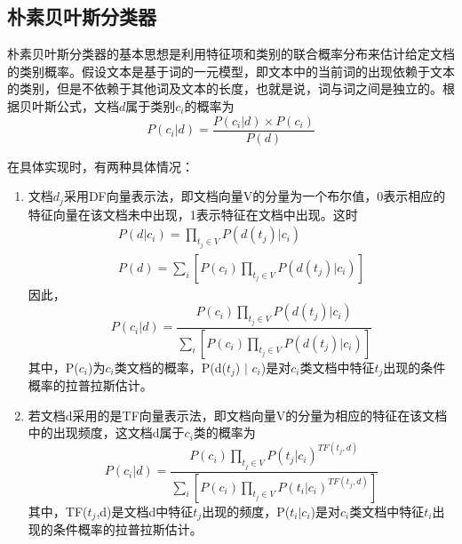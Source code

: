 \documentclass[UTF8]{ctexart}
\begin{document}
\subsection{朴素贝叶斯分类器}	
	朴素贝叶斯分类器的基本思想是利用特征项和类别的联合概率分布来估计给定文档的类别概率。假设文本是基于词的一元模型，即文本中的当前词的出现依赖于文本的类别，但是不依赖于其他词及文本的长度，也就是说，词与词之间是独立的。根据贝叶斯公式，文档$d$属于类别$c_i$的概率为\begin{displaymath}P(c_i \vert d)=\frac{P(c_i \vert d)\times P(c_i)}{P(d)} \end{displaymath}
	\par 在具体实现时，有两种具体情况：
	\begin{enumerate}
		\item 文档$d_j$采用DF向量表示法，即文档向量V的分量为一个布尔值，0表示相应的特征向量在该文档未中出现，1表示特征在文档中出现。这时
		\begin{eqnarray}
			\nonumber P(d \vert c_i)=\prod_{t_j\in V} P(d(t_j) \vert c_i)  \\ 
			\nonumber P(d)=\sum_i[P(c_i)\prod_{t_j\in V} P(d(t_j) \vert c_i)]
		\end{eqnarray}
	因此，
		\begin{displaymath}
			P(c_i \vert d)=\frac{P(c_i)\prod_{t_j\in V} P(d(t_j) \vert c_i)}{\sum_i[P(c_i)\prod_{t_j\in V} P(d(t_j) \vert c_i)]}
		\end{displaymath}
	其中，P($c_i$)为$c_i$类文档的概率，P(d($t_j$) $\vert$ $c_i$)是对$c_i$类文档中特征$t_j$出现的条件概率的拉普拉斯估计。
		\item 若文档d采用的是TF向量表示法，即文档向量V的分量为相应的特征在该文档中的出现频度，这文档d属于$c_i$类的概率为
		\begin{displaymath}
			P(c_i \vert d)=\frac{P(c_i)\prod_{t_j\in V} P(t_j \vert c_i)^{TF(t_j, d)}}{\sum_i[P(c_i)\prod_{t_j\in V} P(t_i \vert c_i)^{TF(t_j, d)}]}	
		\end{displaymath}
	其中，TF($t_j$,d)是文档d中特征$t_j$出现的频度，P($t_i \vert c_i$)是对$c_i$类文档中特征$t_i$出现的条件概率的拉普拉斯估计。
	\end{enumerate}
\end{document}
